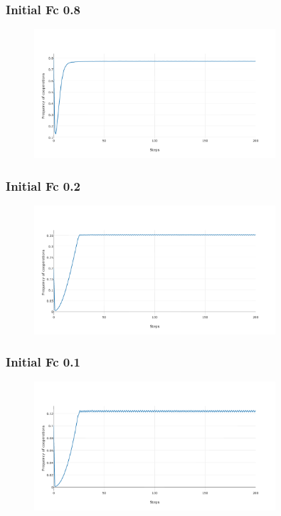 \documentclass[11pt]{article}
\begin{document}
\subsubsection{Initial Fc 0.8}

\begin{figure}[H]
\centering
   \includegraphics[width=0.8\textwidth]{img/part3/bonus-02-D.png}
\end{figure}

\subsubsection{Initial Fc 0.2}

\begin{figure}[H]
\centering
   \includegraphics[width=0.8\textwidth]{img/part3/bonus-08-D.png}
\end{figure}

\subsubsection{Initial Fc 0.1}

\begin{figure}[H]
\centering
   \includegraphics[width=0.8\textwidth]{img/part3/bonus-09-D.png}
\end{figure}
\end{document}
